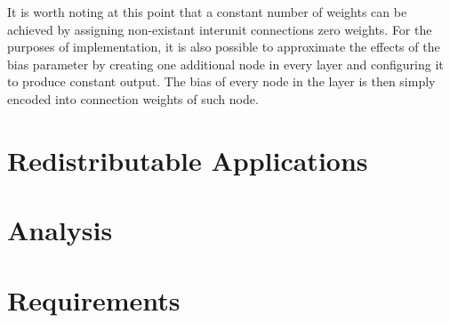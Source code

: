 It is worth noting at this point that a constant number of weights can be achieved by assigning non-existant interunit connections zero weights. For the purposes of implementation, it is also possible to approximate the effects of the bias parameter by creating one additional node in every layer and configuring it to produce constant output. The bias of every node in the layer is then simply encoded into connection weights of such node.

\section{Redistributable Applications}
\todo

\section{Analysis}
\todo

\section{Requirements}
\todo






